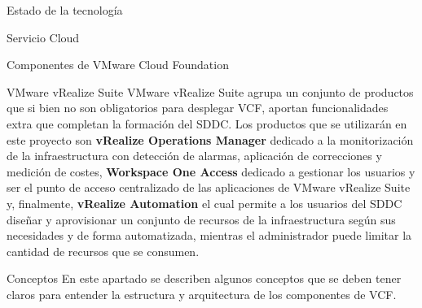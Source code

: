 \begin{chapter}{Estado de la tecnología}
\begin{section}{Servicio Cloud}
\begin{subsection}{Componentes de VMware Cloud Foundation}
    \begin{subsubsection}{VMware vRealize Suite}
        VMware vRealize Suite agrupa un conjunto de productos que si bien no son obligatorios para desplegar VCF, aportan funcionalidades extra que completan la formación del SDDC. Los productos que se utilizarán en este proyecto son \textbf{vRealize Operations Manager} dedicado a la monitorización de la infraestructura con detección de alarmas, aplicación de correcciones y medición de costes, \textbf{Workspace One Access} dedicado a gestionar los usuarios y ser el punto de acceso centralizado de las aplicaciones de VMware vRealize Suite y, finalmente, \textbf{vRealize Automation} el cual permite a los usuarios del SDDC diseñar y aprovisionar un conjunto de recursos de la infraestructura según sus necesidades y de forma automatizada, mientras el administrador puede limitar la cantidad de recursos que se consumen.
    \end{subsubsection}
    \end{subsection}

    \begin{subsection}{Conceptos}
        En este apartado se describen algunos conceptos que se deben tener claros para entender la estructura y arquitectura de los componentes de VCF.
        
        

\end{subsection}
\end{section}
\end{chapter}

